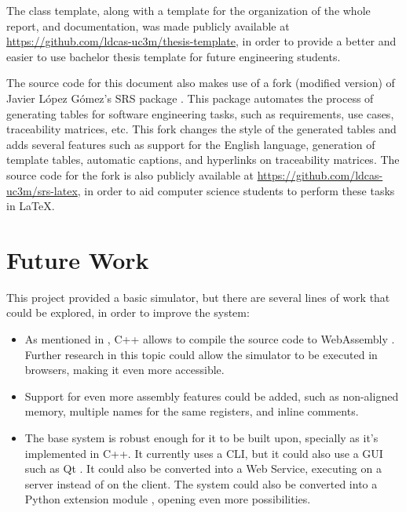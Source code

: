 The class template, along with a template for the organization of the whole report, and documentation, was made publicly available at \url{https://github.com/ldcas-uc3m/thesis-template}, in order to provide a better and easier to use bachelor thesis template for future engineering students.

The source code for this document also makes use of a fork (modified version) of Javier López Gómez's SRS package \parencite{SRSpackage}. This package automates the process of generating tables for software engineering tasks, such as requirements, use cases, traceability matrices, etc. This fork changes the style of the generated tables and adds several features such as support for the English language, generation of template tables, automatic captions, and hyperlinks on traceability matrices. The source code for the fork is also publicly available at \url{https://github.com/ldcas-uc3m/srs-latex}, in order to aid computer science students to perform these tasks in \LaTeX.



\section{Future Work}\label{sec:future-work}
This project provided a basic simulator, but there are several lines of work that could be explored, in order to improve the system:
\begin{itemize}
  \item As mentioned in , C++ allows to compile the source code to WebAssembly \parencite{HaasAndreas2017Btwu}. Further research in this topic could allow the simulator to be executed in browsers, making it even more accessible.
  \item Support for even more \gls{assembly} features could be added, such as non-aligned memory, multiple names for the same registers, and inline comments.
  \item The base system is robust enough for it to be built upon, specially as it's implemented in C++. It currently uses a \gls{CLI}, but it could also use a \gls{GUI} such as Qt \parencite{QtFramework}. It could also be converted into a Web Service, executing on a server instead of on the client. The system could also be converted into a Python extension module \parencite{pythonExtension}, opening even more possibilities.
\end{itemize}

